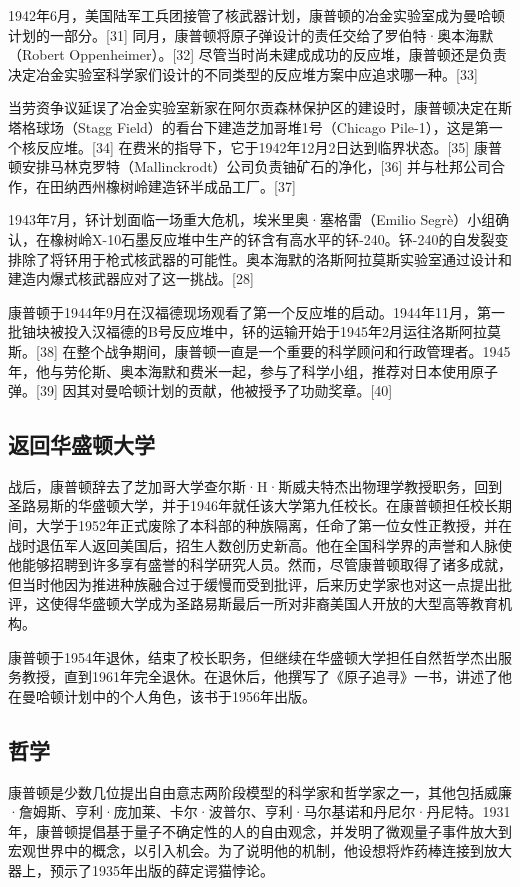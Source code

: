 1942年6月，美国陆军工兵团接管了核武器计划，康普顿的冶金实验室成为曼哈顿计划的一部分。[31] 同月，康普顿将原子弹设计的责任交给了罗伯特·奥本海默（Robert Oppenheimer）。[32] 尽管当时尚未建成成功的反应堆，康普顿还是负责决定冶金实验室科学家们设计的不同类型的反应堆方案中应追求哪一种。[33]

当劳资争议延误了冶金实验室新家在阿尔贡森林保护区的建设时，康普顿决定在斯塔格球场（Stagg Field）的看台下建造芝加哥堆1号（Chicago Pile-1），这是第一个核反应堆。[34] 在费米的指导下，它于1942年12月2日达到临界状态。[35] 康普顿安排马林克罗特（Mallinckrodt）公司负责铀矿石的净化，[36] 并与杜邦公司合作，在田纳西州橡树岭建造钚半成品工厂。[37]

1943年7月，钚计划面临一场重大危机，埃米里奥·塞格雷（Emilio Segrè）小组确认，在橡树岭X-10石墨反应堆中生产的钚含有高水平的钚-240。钚-240的自发裂变排除了将钚用于枪式核武器的可能性。奥本海默的洛斯阿拉莫斯实验室通过设计和建造内爆式核武器应对了这一挑战。[28]

康普顿于1944年9月在汉福德现场观看了第一个反应堆的启动。1944年11月，第一批铀块被投入汉福德的B号反应堆中，钚的运输开始于1945年2月运往洛斯阿拉莫斯。[38] 在整个战争期间，康普顿一直是一个重要的科学顾问和行政管理者。1945年，他与劳伦斯、奥本海默和费米一起，参与了科学小组，推荐对日本使用原子弹。[39] 因其对曼哈顿计划的贡献，他被授予了功勋奖章。[40]
\subsection{返回华盛顿大学}
战后，康普顿辞去了芝加哥大学查尔斯·H·斯威夫特杰出物理学教授职务，回到圣路易斯的华盛顿大学，并于1946年就任该大学第九任校长。在康普顿担任校长期间，大学于1952年正式废除了本科部的种族隔离，任命了第一位女性正教授，并在战时退伍军人返回美国后，招生人数创历史新高。他在全国科学界的声誉和人脉使他能够招聘到许多享有盛誉的科学研究人员。然而，尽管康普顿取得了诸多成就，但当时他因为推进种族融合过于缓慢而受到批评，后来历史学家也对这一点提出批评，这使得华盛顿大学成为圣路易斯最后一所对非裔美国人开放的大型高等教育机构。

康普顿于1954年退休，结束了校长职务，但继续在华盛顿大学担任自然哲学杰出服务教授，直到1961年完全退休。在退休后，他撰写了《原子追寻》一书，讲述了他在曼哈顿计划中的个人角色，该书于1956年出版。
\subsection{哲学}
康普顿是少数几位提出自由意志两阶段模型的科学家和哲学家之一，其他包括威廉·詹姆斯、亨利·庞加莱、卡尔·波普尔、亨利·马尔基诺和丹尼尔·丹尼特。1931年，康普顿提倡基于量子不确定性的人的自由观念，并发明了微观量子事件放大到宏观世界中的概念，以引入机会。为了说明他的机制，他设想将炸药棒连接到放大器上，预示了1935年出版的薛定谔猫悖论。

